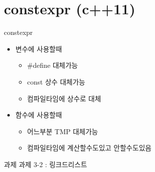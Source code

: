 \documentclass[10pt]{beamer}
\begin{document}
\begin{frame}{TMP는 나쁘다}
    \href{}{\textcolor{참고}
    \begin{itemize}
        \item 극암의 코드 가독성
    \end{itemize}
\end{frame}    


\section{constexpr (c++11)}
\begin{frame}{constexpr}
    \begin{itemize}
        \item 변수에 사용할때
        \begin{itemize}
            \item #define 대체가능
            \item const 상수 대체가능
            \item 컴파일타임에 상수로 대체
        \end{itemize}
        \item 함수에 사용할때
        \begin{itemize}
            \item 어느부분 TMP 대체가능
            \item 컴파일타임에 계산할수도있고 안할수도있음
        \end{itemize}
    \end{itemize}
\end{frame}    



\begin{frame}{과제}
    과제 3-2 : 링크드리스트
\end{frame}    
\end{document}
